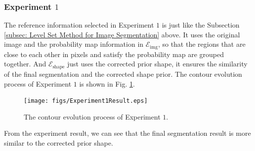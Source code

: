 \subsubsection{Experiment $1$}
The reference information selected in Experiment $1$ is just like the Subsection \ref{subsec: Level Set Method for Image Segmentation} above. It uses the original image and the probability map information in $\mathcal{E}_{\text{img}}$, so that the regions that are close to each other in pixels and satisfy the probability map are grouped together. And $\mathcal{E}_{\text{shape}}$ just uses the corrected prior shape, it ensures the similarity of the final segmentation and the corrected shape prior. The contour evolution process of Experiment $1$ is shown in Fig. \ref{fig: The contour evolution process of Experiment 1}.
\begin{figure}[h]
    \centering
    \texttt{[image: figs/Experiment1Result.eps]}
    \caption{The contour evolution process of Experiment $1$.}
    \label{fig: The contour evolution process of Experiment 1}
\end{figure}
From the experiment result, we can see that the final segmentation result is more similar to the corrected prior shape.


